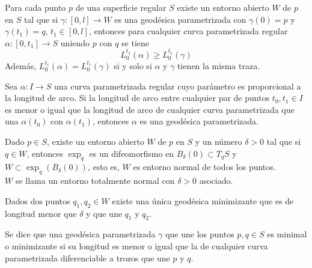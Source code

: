 \begin{corollary}
    Para cada punto $p$ de una superficie regular $S$ existe un entorno abierto $W$ de $p$ en $S$ tal que si $\gamma : [0, l] \to W$ es una geodésica parametrizada con $\gamma(0) = p$ y $\gamma(t_1) = q$, $t_1 \in [0, l]$, entonces para cualquier curva parametrizada regular $\alpha : [0, t_1] \to S$ uniendo $p$ con $q$ se tiene
    $$L^{t_1}_0(\alpha) \geq L^{t_1}_0(\gamma)$$
    Además, $L^{t_1}_0(\alpha) = L^{t_1}_0(\gamma)$ si y solo si $\alpha$ y $\gamma$ tienen la misma traza.
\end{corollary}

\begin{proposition}
    Sea $\alpha : I \to S$ una curva parametrizada regular cuyo parámetro es proporcional a la longitud de arco.
    Si la longitud de arco entre cualquier par de puntos $t_0, t_1 \in I$ es menor o igual que la longitud de arco de cualquier curva parametrizada que una $\alpha(t_0)$ con $\alpha(t_1)$, entonces $\alpha$ es una geodésica parametrizada.
\end{proposition}

\begin{proposition}
    Dado $p \in S$, existe un entorno abierto $W$ de $p$ en $S$ y un número $\delta>0$ tal que si $q \in W$, entonces $\exp_q$ es un difeomorfismo en $B_\delta(0) \subset T_qS$ y $W \subset \exp_q(B_\delta(0))$, esto es, $W$ es entorno normal de todos los puntos.\\
    $W$ se llama un entorno totalmente normal con $\delta>0$ asociado.
\end{proposition}

\begin{corollary}
    Dados dos puntos $q_1, q_2 \in W$ existe una única geodésica minimizante que es de longitud menor que $\delta$ y que une $q_1$ y $q_2$.
\end{corollary}

\begin{definition}
    Se dice que una geodésica parametrizada $\gamma$ que une los puntos $p, q \in S$ es minimal o minimizante si su longitud es menor o igual que la de cualquier curva parametrizada diferenciable a trozos que une $p$ y $q$.
\end{definition}
